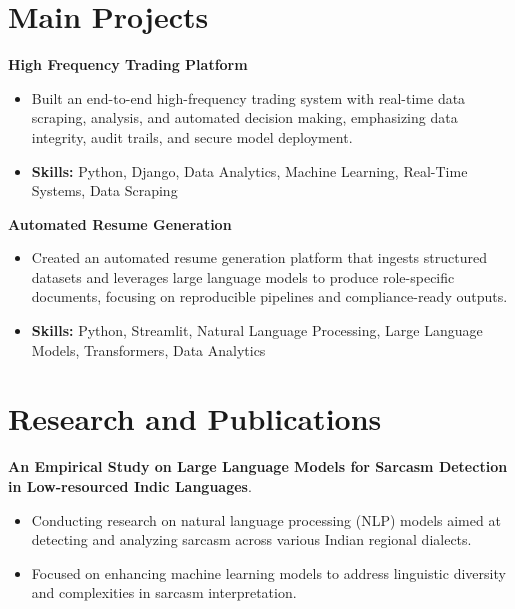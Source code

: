 \documentclass[a4paper,11pt]{article}
\begin{document}
\section{\textbf{Main Projects}}

\vspace{1mm}
  \textbf{High Frequency Trading Platform  }
\vspace{-1.5mm} %
\begin{itemize}
  \item Built an end-to-end high-frequency trading system with real-time data scraping, analysis, and automated decision making, emphasizing data integrity, audit trails, and secure model deployment.
\vspace{-3mm}
  \item \textbf{Skills:} Python, Django, Data Analytics, Machine Learning, Real-Time Systems, Data Scraping
\end{itemize}


\vspace{1mm}
   \textbf{Automated Resume Generation }
\vspace{-1.5mm} %
\begin{itemize}
  \item Created an automated resume generation platform that ingests structured datasets and leverages large language models to produce role-specific documents, focusing on reproducible pipelines and compliance-ready outputs.
\vspace{-3mm}
  \item \textbf{Skills:} Python, Streamlit, Natural Language Processing, Large Language Models, Transformers, Data Analytics
\end{itemize}



\section{\textbf{Research and Publications} \hfill }
\vspace{1mm}
  \textbf{An Empirical Study on Large Language Models for Sarcasm Detection in Low-resourced Indic Languages}.
\vspace{-1mm} %
\begin{itemize}
  \item Conducting research on natural language processing (NLP) models aimed at detecting and analyzing sarcasm across various Indian regional dialects.
\vspace{-3mm}
  \item Focused on enhancing machine learning models to address linguistic diversity and complexities in sarcasm interpretation.
\end{itemize}
\end{document}

